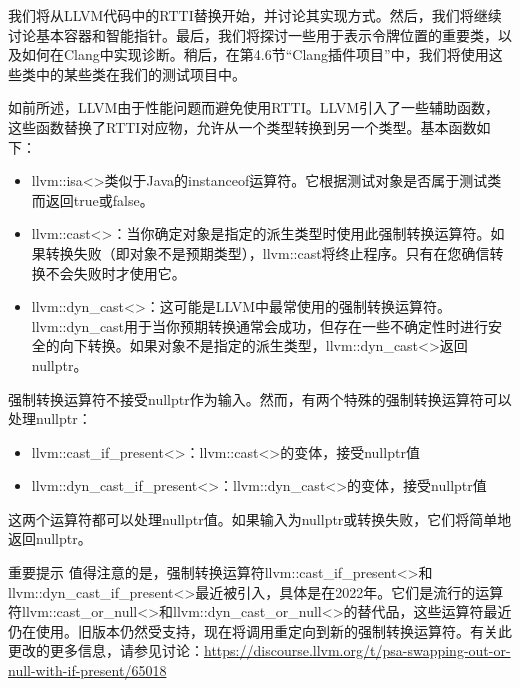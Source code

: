 我们将从LLVM代码中的RTTI替换开始，并讨论其实现方式。然后，我们将继续讨论基本容器和智能指针。最后，我们将探讨一些用于表示令牌位置的重要类，以及如何在Clang中实现诊断。稍后，在第4.6节“Clang插件项目”中，我们将使用这些类中的某些类在我们的测试项目中。


如前所述，LLVM由于性能问题而避免使用RTTI。LLVM引入了一些辅助函数，这些函数替换了RTTI对应物，允许从一个类型转换到另一个类型。基本函数如下：

\begin{itemize}
\item
llvm::isa<>类似于Java的instanceof运算符。它根据测试对象是否属于测试类而返回true或false。

\item
llvm::cast<>：当你确定对象是指定的派生类型时使用此强制转换运算符。如果转换失败（即对象不是预期类型），llvm::cast将终止程序。只有在您确信转换不会失败时才使用它。

\item
llvm::dyn\_cast<>：这可能是LLVM中最常使用的强制转换运算符。llvm::dyn\_cast用于当你预期转换通常会成功，但存在一些不确定性时进行安全的向下转换。如果对象不是指定的派生类型，llvm::dyn\_cast<>返回nullptr。
\end{itemize}

强制转换运算符不接受nullptr作为输入。然而，有两个特殊的强制转换运算符可以处理nullptr：

\begin{itemize}
\item
llvm::cast\_if\_present<>：llvm::cast<>的变体，接受nullptr值

\item
llvm::dyn\_cast\_if\_present<>：llvm::dyn\_cast<>的变体，接受nullptr值
\end{itemize}

这两个运算符都可以处理nullptr值。如果输入为nullptr或转换失败，它们将简单地返回nullptr。

\begin{myNotic}{重要提示}
值得注意的是，强制转换运算符llvm::cast\_if\_present<>和llvm::dyn\_cast\_if\_present<>最近被引入，具体是在2022年。它们是流行的运算符llvm::cast\_or\_null<>和llvm::dyn\_cast\_or\_null<>的替代品，这些运算符最近仍在使用。旧版本仍然受支持，现在将调用重定向到新的强制转换运算符。有关此更改的更多信息，请参见讨论：\url{https://discourse.llvm.org/t/psa-swapping-out-or-null-with-if-present/65018}
\end{myNotic}

